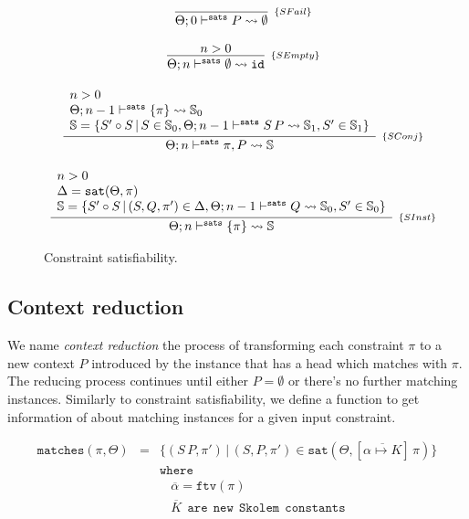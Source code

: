 \documentclass[a4paper, 11pt]{article}
\begin{document}
\begin{figure}[H] 
  \[
    \begin{array}{c}
      \infer[_{\{SFail\}}]
            {\sats{P}{\emptyset}{0}} 
            {}
      \\ \\ 
      \infer[_{\{SEmpty\}}]
            {\sats{\emptyset}{\id}{n}}
            {n > 0}
      \\ \\ 
      \infer[_{\{SConj\}}]
            {\sats{\pi , P}{\mathbb{S}}{n}} 
            {\begin{array}{l}
              n > 0\\
              \sats{\{\pi\}}{\mathbb{S}_0}{n - 1}\\
              \mathbb{S} = \{S'\circ S\,|\,S \in \mathbb{S}_0, \sats{S\,P}{\mathbb{S}_1}{n - 1}, S' \in \mathbb{S}_1\}
             \end{array}}
      \\ \\ 
      \infer[_{\{SInst\}}] 
            {\sats{\{\pi\}}{\mathbb{S}}{n}}
            {\begin{array}{l}
              n > 0 \\ 
              \Delta = \mathtt{sat}(\Theta,\pi)\\
              \mathbb{S} = \{S'\circ S\,|\,(S,Q,\pi')\in\Delta, \sats{Q}{\mathbb{S}_0}{n - 1}, S' \in \mathbb{S}_0\}
             \end{array}}
    \end{array}
  \]
  \caption{Constraint satisfiability.}
  \label{fig:sat-algorithm}
\end{figure}

\subsection{Context reduction} 

We name \emph{context reduction} the process of transforming 
each constraint $\pi$ to a new context $P$ introduced 
by the instance that has a head which matches with 
$\pi$. The reducing process continues until either $P = \emptyset$ 
or there's no further matching instances. Similarly to 
constraint satisfiability, we define a function to 
get information of about matching instances for a given 
input constraint.

\[
  \begin{array}{lcl}
    \mathtt{matches}(\pi,\Theta) & = &\{(S\,P,\pi')\,|\,(S,P,\pi') \in \mathtt{sat}(\Theta,[\overline{\alpha\mapsto K}]\,\pi)\}\\
                          &   &\mathtt{where} \\ 
                          &   &\:\:\:\:\overline{\alpha} = \mathtt{ftv}(\pi)\\
                          &   &\:\:\:\:\overline{K}\:\:\mathtt{are}\:\:\mathtt{new}\:\:\mathtt{Skolem}\:\:\mathtt{constants}
  \end{array}
\]
\end{document}
